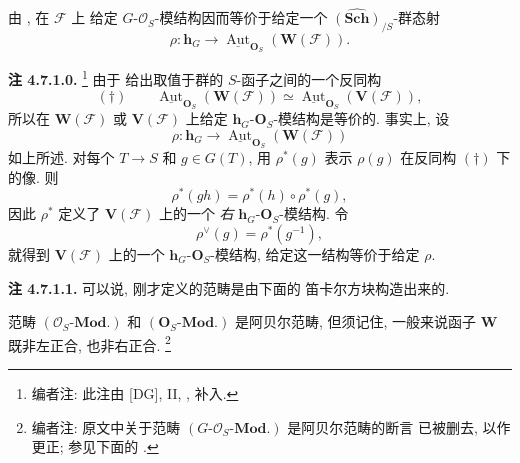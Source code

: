 由 , 在 \(\mathscr F\) 上
给定 \(G\)-\(\mathcal O_S\)-模结构因而等价于给定一个
\(\widehat{(\mathbf{Sch})}_{/S}\)-群态射
\[
  \rho:\mathbf h_G\longrightarrow
    \underline{\operatorname{Aut}}_{\mathbf O_S}
      (\mathbf W(\mathscr F)).
\]

\medskip
\noindent{}\textbf{注 4.7.1.0.}
\footnote{编者注: 此注由 [DG], II,
,
 补入.}
由于  给出取值于群的
\(S\)-函子之间的一个反同构
\[
  (\dagger)\qquad
  \underline{\operatorname{Aut}}_{\mathbf O_S}
    (\mathbf W(\mathscr F))
  \simeq
  \underline{\operatorname{Aut}}_{\mathbf O_S}
    (\mathbf V(\mathscr F)),
\]
所以在 \(\mathbf W(\mathscr F)\) 或 \(\mathbf V(\mathscr F)\)
上给定 \(\mathbf h_G\)-\(\mathbf O_S\)-模结构是等价的.
事实上, 设
\[
  \rho:\mathbf h_G\longrightarrow
  \underline{\operatorname{Aut}}_{\mathbf O_S}
    (\mathbf W(\mathscr F))
\]
如上所述. 对每个 \(T\to S\) 和 \(g\in G(T)\),
用 \(\rho^*(g)\) 表示 \(\rho(g)\) 在反同构 \((\dagger)\)
下的像. 则
\[
  \rho^*(gh)=\rho^*(h)\circ\rho^*(g),
\]
因此 \(\rho^*\) 定义了 \(\mathbf V(\mathscr F)\) 上的一个
\emph{右} \(\mathbf h_G\)-\(\mathbf O_S\)-模结构. 令
\[
  \rho^{\vee}(g)=\rho^*(g^{-1}),
\]
就得到 \(\mathbf V(\mathscr F)\) 上的一个
\(\mathbf h_G\)-\(\mathbf O_S\)-模结构, 给定这一结构等价于给定
\(\rho\).

\medskip
\noindent{}\textbf{注 4.7.1.1.}
可以说, 刚才定义的范畴是由下面的 笛卡尔方块构造出来的.

\begin{figure}[H]
  \centering
  
  \label{fig:sga3-exp1-p028-rem4711-category-squares}
\end{figure}

范畴 \((\mathcal O_S\text{-}\mathbf{Mod.})\) 和
\((\mathbf O_S\text{-}\mathbf{Mod.})\) 是阿贝尔范畴, 但须记住,
一般来说函子 \(\mathbf W\) 既非左正合, 也非右正合.
\footnote{编者注: 原文中关于范畴
\((G\text{-}\mathcal O_S\text{-}\mathbf{Mod.})\) 是阿贝尔范畴的断言
已被删去, 以作更正; 参见下面的
.}

